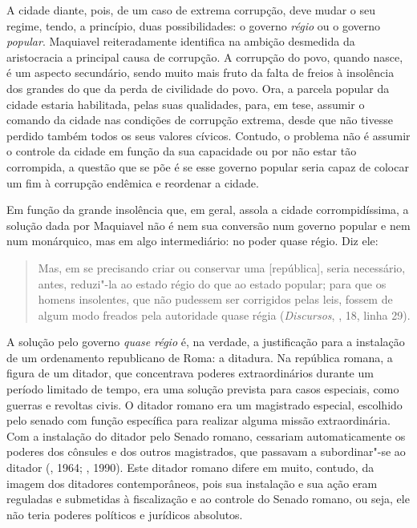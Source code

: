 A cidade diante, pois, de um caso de extrema corrupção, deve mudar o seu
regime, tendo, a princípio, duas possibilidades: o governo \emph{régio}
ou o governo \emph{popular}. Maquiavel reiteradamente identifica na
ambição desmedida da aristocracia a principal causa de corrupção. A
corrupção do povo, quando nasce, é um aspecto secundário, sendo muito
mais fruto da falta de freios à insolência dos grandes do que da perda
de civilidade do povo. Ora, a parcela popular da cidade estaria
habilitada, pelas suas qualidades, para, em tese, assumir o comando da
cidade nas condições de corrupção extrema, desde que não tivesse perdido
também todos os seus valores cívicos. Contudo, o problema não é assumir
o controle da cidade em função da sua capacidade ou por não estar tão
corrompida, a questão que se põe é se esse governo popular seria capaz
de colocar um fim à corrupção endêmica e reordenar a cidade.

Em função da grande insolência que, em geral, assola a cidade
corrompidíssima, a solução dada por Maquiavel não é nem sua conversão
num governo popular e nem num monárquico, mas em algo intermediário: no
poder quase régio. Diz ele:

\begin{quote}
Mas, em se precisando criar ou conservar uma {[}república{]}, seria
necessário, antes, reduzi"-la ao estado régio do que ao estado popular;
para que os homens insolentes, que não pudessem ser corrigidos pelas
leis, fossem de algum modo freados pela autoridade quase régia
(\emph{Discursos}, , 18, linha 29).
\end{quote}

A solução pelo governo \emph{quase régio} é, na verdade, a justificação
para a instalação de um ordenamento republicano de Roma: a ditadura. Na
república romana, a figura de um ditador, que concentrava poderes
extraordinários durante um período limitado de tempo, era uma solução
prevista para casos especiais, como guerras e revoltas civis. O ditador
romano era um magistrado especial, escolhido pelo senado com função
específica para realizar alguma missão extraordinária. Com a instalação
do ditador pelo Senado romano, cessariam automaticamente os poderes dos
cônsules e dos outros magistrados, que passavam a subordinar"-se ao
ditador (, 1964; , 1990). Este ditador romano difere em
muito, contudo, da imagem dos ditadores contemporâneos, pois sua
instalação e sua ação eram reguladas e submetidas à fiscalização e ao
controle do Senado romano, ou seja, ele não teria poderes políticos e
jurídicos absolutos.

